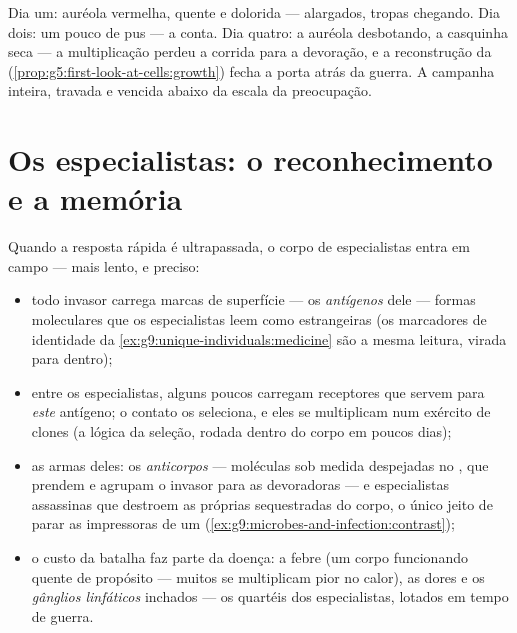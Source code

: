 \begin{example}\label{ex:g9:immune-defenses:cut}
Dia um: auréola vermelha, quente e dolorida --- 
alargados, tropas chegando. Dia dois: um pouco de pus --- a
conta. Dia quatro: a auréola desbotando, a casquinha seca ---
a multiplicação perdeu a corrida para a devoração, e a
reconstrução da 
(\cref{prop:g5:first-look-at-cells:growth}) fecha a porta
atrás da guerra. A campanha inteira, travada e vencida abaixo
da escala da preocupação.
\end{example}

\section{Os especialistas: o reconhecimento e a memória}

\begin{proposition}\label{prop:g9:immune-defenses:specific}
Quando a resposta rápida é ultrapassada, o corpo de
especialistas entra em campo --- mais lento, e preciso:
\begin{itemize}
  \item todo invasor carrega marcas de superfície --- os
        \emph{antígenos} dele --- formas
        moleculares que os especialistas leem como
        estrangeiras (os marcadores de identidade da
        \cref{ex:g9:unique-individuals:medicine} são a mesma
        leitura, virada para dentro);
  \item entre os  especialistas, alguns
        poucos carregam receptores que servem para
        \emph{este} antígeno; o contato os seleciona, e eles
        se multiplicam num exército de clones (a lógica da
        seleção, rodada dentro do corpo em poucos dias);
  \item as armas deles: os \emph{anticorpos}
        --- moléculas sob medida despejadas no , que
        prendem e agrupam o invasor para as devoradoras --- e
        especialistas assassinas que destroem as próprias
         sequestradas do corpo, o único jeito de parar
        as impressoras de um 
        (\cref{ex:g9:microbes-and-infection:contrast});
  \item o custo da batalha faz parte da doença: a febre (um
        corpo funcionando quente de propósito --- muitos
         se multiplicam pior no calor), as dores e
        os \emph{gânglios linfáticos} inchados --- os
        quartéis dos especialistas, lotados em tempo de
        guerra.
\end{itemize}
\end{proposition}
\admitted


